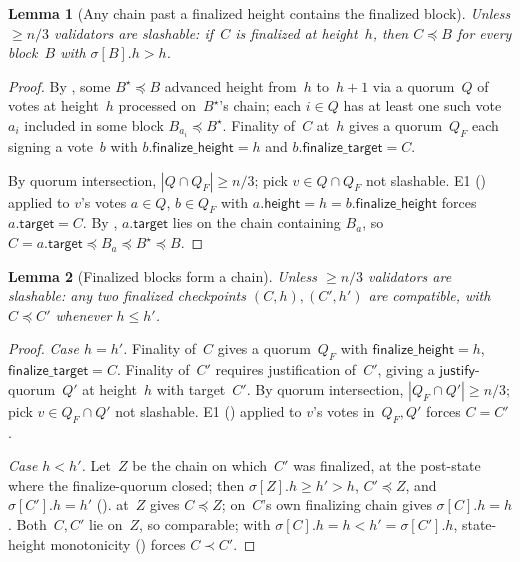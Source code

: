\documentclass{article}
\newcommand{\target}{\mathsf{target}}
\newcommand{\height}{\mathsf{height}}
\newcommand{\just}{\ensuremath{\mathsf{justify}}\xspace}
\newcommand{\finalizeHeight}{\mathsf{finalize\_height}}
\newcommand{\finalizeTarget}{\mathsf{finalize\_target}}
\theoremstyle{plain}
\newtheorem{lemma}{Lemma}
\theoremstyle{definition}
\theoremstyle{remark}
\begin{document}
\begin{lemma}[Any chain past a finalized height contains the finalized block]\label{lem:mainsafety}
Unless $\geq n/3$ validators are slashable: if~$C$ is finalized at height~$h$, then $C \preceq B$ for every block~$B$ with $\sigma[B].h > h$.
\end{lemma}

\begin{proof}
By , some $B^\star \preceq B$ advanced height from~$h$ to~$h+1$ via a quorum~$Q$ of votes at height~$h$ processed on~$B^\star$'s chain; each $i \in Q$ has at least one such vote~$a_i$ included in some block $B_{a_i} \preceq B^\star$.
Finality of~$C$ at~$h$ gives a quorum~$Q_F$ each signing a vote~$b$ with $b.\finalizeHeight = h$ and $b.\finalizeTarget = C$.

By quorum intersection, $|Q \cap Q_F| \geq n/3$; pick $v \in Q \cap Q_F$ not slashable.
E1 () applied to $v$'s votes $a \in Q$, $b \in Q_F$ with $a.\height = h = b.\finalizeHeight$ forces $a.\target = C$.
By , $a.\target$ lies on the chain containing $B_a$, so $C = a.\target \preceq B_a \preceq B^\star \preceq B$.
\end{proof}

\begin{lemma}[Finalized blocks form a chain]\label{lem:finchain}
Unless $\geq n/3$ validators are slashable: any two finalized checkpoints $(C, h), (C', h')$ are compatible, with $C \preceq C'$ whenever $h \leq h'$.
\end{lemma}

\begin{proof}
\emph{Case $h = h'$.}
Finality of~$C$ gives a quorum~$Q_F$ with $\finalizeHeight = h$, $\finalizeTarget = C$.
Finality of~$C'$ requires justification of~$C'$, giving a \just-quorum~$Q'$ at height~$h$ with target~$C'$.
By quorum intersection, $|Q_F \cap Q'| \geq n/3$; pick $v \in Q_F \cap Q'$ not slashable.
E1 () applied to $v$'s votes in~$Q_F, Q'$ forces $C = C'$.

\emph{Case $h < h'$.}
Let~$Z$ be the chain on which~$C'$ was finalized, at the post-state where the finalize-quorum closed; then $\sigma[Z].h \geq h' > h$, $C' \preceq Z$, and $\sigma[C'].h = h'$ ().
 at~$Z$ gives $C \preceq Z$;  on~$C$'s own finalizing chain gives $\sigma[C].h = h$.
Both~$C, C'$ lie on~$Z$, so comparable; with $\sigma[C].h = h < h' = \sigma[C'].h$, state-height monotonicity () forces $C \prec C'$.
\end{proof}
\end{document}
